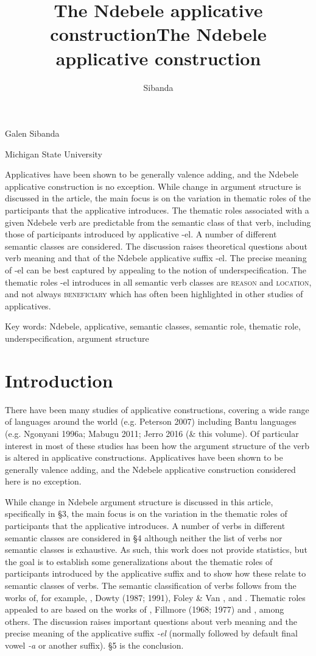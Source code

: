 \documentclass[output=paper]{langsci/langscibook}
\title{The Ndebele applicative construction}
\author{%
 Sibanda \affiliation{} 
}
\begin{document}
\title{The Ndebele applicative construction}

Galen Sibanda

Michigan State University

\begin{stylelsAbstract}
Applicatives have been shown to be generally valence adding, and the Ndebele applicative construction is no exception. While change in argument structure is discussed in the article, the main focus is on the variation in thematic roles of the participants that the applicative introduces. The thematic roles associated with a given Ndebele verb are predictable from the semantic class of that verb, including those of participants introduced by applicative -el. A number of different semantic classes are considered. The discussion raises theoretical questions about verb meaning and that of the Ndebele applicative suffix -el. The precise meaning of -el can be best captured by appealing to the notion of underspecification. The thematic roles -el introduces in all semantic verb classes are \textsc{reason} and \textsc{location}, and not always \textsc{beneficiary} which has often been highlighted in other studies of applicatives. 
\end{stylelsAbstract}

Key words: Ndebele, applicative, semantic classes, semantic role, thematic role,   underspecification, argument structure

\section{ Introduction}

There have been many studies of applicative constructions, covering a wide range of languages around the world (e.g. Peterson 2007) including Bantu languages (e.g. Ngonyani 1996a; Mabugu 2011; Jerro 2016  (\& this volume). Of particular interest in most of these studies has been how the argument structure of the verb is altered in applicative constructions. Applicatives have been shown to be generally valence adding, and the Ndebele applicative construction considered here is no exception. 

  While change in Ndebele argument structure is discussed in this article, specifically in §3, the main focus is on the variation in the thematic roles of participants that the applicative introduces. A number of verbs in different semantic classes are considered in §4 although neither the list of verbs nor semantic classes is exhaustive. As such, this work does not provide statistics, but the goal is to establish some generalizations about the thematic roles of participants introduced by the applicative suffix and to show how these relate to semantic classes of verbs. The semantic classification of verbs follows from the works of, for example, \citet{Chafe1970}, Dowty (1987; 1991), Foley \& Van \citet{Valin1984}, and \citet{Payne1997}. Thematic roles appealed to are based on the works of \citet{Frawley1992}, Fillmore (1968; 1977) and \citet{Halliday1970}, among others. The discussion raises important questions about verb meaning and the precise meaning of the applicative suffix \textit{{}-el }(normally followed by default final vowel \textit{{}-a} or another suffix). §5 is the conclusion.
\end{document}
